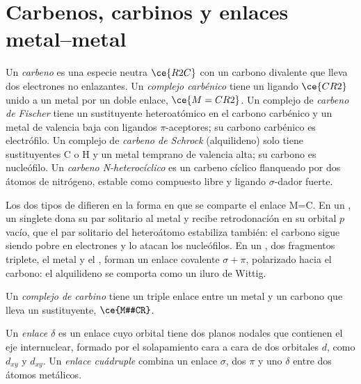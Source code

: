 \section{Carbenos, carbinos y enlaces metal--metal}

\begin{definition}\label{def:b3:organometallic-bonding:carbene}
Un \emph{carbeno} es una especie neutra $\ce{R2C}$ con un carbono divalente
que lleva dos electrones no enlazantes. Un \emph{complejo carbénico}
tiene un ligando $\ce{CR2}$ unido a un metal por un doble enlace, $\ce{M=CR2}$. Un complejo de
\emph{carbeno de Fischer} tiene un sustituyente heteroatómico
en el carbono carbénico y un metal de valencia baja con ligandos $\pi$-aceptores; su carbono
carbénico es electrófilo. Un complejo de \emph{carbeno de Schrock} (alquilideno)
solo tiene sustituyentes C o H y un metal temprano de valencia alta; su carbono es
nucleófilo. Un \emph{carbeno N-heterocíclico} es un
carbeno cíclico flanqueado por dos átomos de nitrógeno, estable como compuesto libre y ligando
$\sigma$-dador fuerte.
\end{definition}

Los dos tipos de  difieren en la forma en que se comparte el enlace M=C.
En un , un  singlete dona su par solitario al metal y
recibe retrodonación en su orbital $p$ vacío, que el par solitario del heteroátomo
estabiliza también: el carbono sigue siendo pobre en electrones y lo atacan los nucleófilos. En un
, dos fragmentos triplete, el metal y el , forman un enlace covalente $\sigma +
\pi$, polarizado hacia el carbono: el alquilideno se comporta como un iluro de Wittig.

\begin{definition}\label{def:b3:organometallic-bonding:carbyne}
Un \emph{complejo de carbino} tiene un triple enlace entre un metal
y un carbono que lleva un sustituyente, $\ce{M#CR}$.
\end{definition}

\begin{definition}\label{def:b3:organometallic-bonding:delta}
Un \emph{enlace $\delta$} es un enlace cuyo orbital tiene dos planos nodales
que contienen el eje internuclear, formado por el solapamiento cara a cara de dos orbitales
$d$, como $d_{xy}$ y $d_{xy}$. Un \emph{enlace cuádruple}
combina un enlace $\sigma$, dos $\pi$ y uno $\delta$ entre dos átomos metálicos.
\end{definition}

